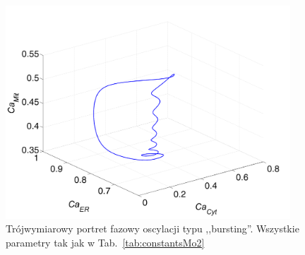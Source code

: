 \begin{figure}[ht]
	\centering
	\includegraphics[width=0.95\textwidth]{rysunki/rozdzial_5/bursting_cycleMo2}
	\caption[Portret fazowy 3-D - oscylacje ,,bursting'' w Modelu \#2]{Trójwymiarowy portret fazowy oscylacji typu ,,bursting''. Wszystkie parametry tak jak w Tab.~\ref{tab:constantsMo2}}
	\label{fig:phaseportraitcomplexMo2}
\end{figure}

%
%
%

